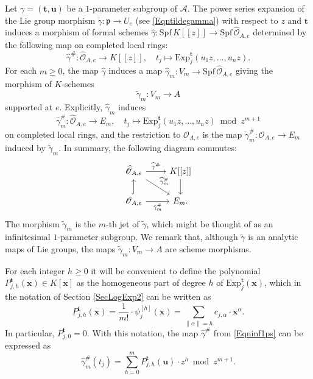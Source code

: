 \documentclass[11pt]{amsart}
\theoremstyle{remark}
\numberwithin{equation}{section}
\newcommand{\pfrak}{\mathfrak{p}}
\newcommand{\Acal}{\mathscr{A}}
\newcommand{\Ocal}{\mathscr{O}}
\newcommand{\xx}{\mathbf{x}}
\newcommand{\ttt}{\mathbf{t}}
\newcommand{\uu}{\mathbf{u}}
\newcommand{\Exp}{\mathrm{Exp}}
\newcommand{\Spf}{\mathrm{Spf}\,}
\begin{document}
Let $\gamma=(\ttt,\uu)$ be a $1$-parameter subgroup of $\Acal$. The power series expansion of the Lie group morphism $\tilde{\gamma}:\pfrak\to U_e$ (see \eqref{Eqntildegamma}) with respect to $z$ and $\ttt$ induces a morphism of formal schemes $\widehat{\gamma}: \Spf K[[z]]\to  \Spf \widehat{\Ocal}_{A,e}$ determined by the following map on completed local rings:
\begin{equation}\label{Eqnhatgamma}
\widehat{\gamma}^\#: \widehat{\Ocal}_{A,e}\to K[[z]], \quad t_j\mapsto \Exp^\ttt_j(u_1z,...,u_nz).
\end{equation}
For each $m\ge 0$, the map $\widehat{\gamma}$ induces a map $\widehat{\gamma}_m:V_m\to \Spf  \widehat{\Ocal}_{A,e}$ giving the morphism of $K$-schemes
$$
\tilde{\gamma}_m:V_m\to A
$$
supported at $e$. Explicitly, $\widehat{\gamma}_m$ induces 
\begin{equation}\label{Eqninf1ps}
\widehat{\gamma}_m^\#: \widehat{\Ocal}_{A,e}\to E_m, \quad t_j\mapsto \Exp^\ttt_j(u_1z,...,u_nz)\bmod z^{m+1}
\end{equation}
on completed local rings, and the restriction to $\Ocal_{A,e}$ is the map $\tilde{\gamma}_m^\#:\Ocal_{A,e}\to E_m$ induced by $\tilde{\gamma}_m$. In summary, the following diagram commutes:
\begin{equation}\label{Eqngammas}
\begin{tikzcd}
\widehat{\Ocal}_{A,e}   \arrow{r}{\widehat{\gamma}^\#} \arrow{rd}{\widehat{\gamma}^\#_m}   &  K[[z]]  \arrow{d}  \\
\Ocal_{A,e}  \arrow[hook]{u}  \arrow[swap]{r}{\tilde{\gamma}^\#_m }&   E_m.
\end{tikzcd}
\end{equation}
The morphism $\tilde{\gamma}_m$ is the $m$-th jet of $\tilde{\gamma}$, which might be thought of as an infinitesimal $1$-parameter subgroup. We remark that, although $\tilde{\gamma}$ is an analytic maps of Lie groups, the maps $\tilde{\gamma}_m:V_m\to A$ are scheme morphisms.

For each integer $h\ge 0$ it will be convenient to define the polynomial $P^{\ttt}_{j,h}(\xx)\in K[\xx]$ as the homogeneous part of degree $h$ of $\Exp^\ttt_j(\xx)$, which in the notation of Section \ref{SecLogExp2} can be written as
$$
P^{\ttt}_{j,h}(\xx)=\frac{1}{m!}\cdot \psi^{[h]}_j(\xx)=\sum_{\|\alpha\|=h} c_{j,\alpha}\cdot \xx^\alpha.
$$
In particular, $P^\ttt_{j,0}=0$. With this notation, the map $\widehat{\gamma}^\#$ from \eqref{Eqninf1ps} can be expressed as
\begin{equation}\label{Eqninf1psP}
\widehat{\gamma}^\#_m(t_j)=\sum_{h=0}^{m} P^\ttt_{j,h}(\uu)\cdot z^h\bmod z^{m+1}. 
\end{equation}
\end{document}
